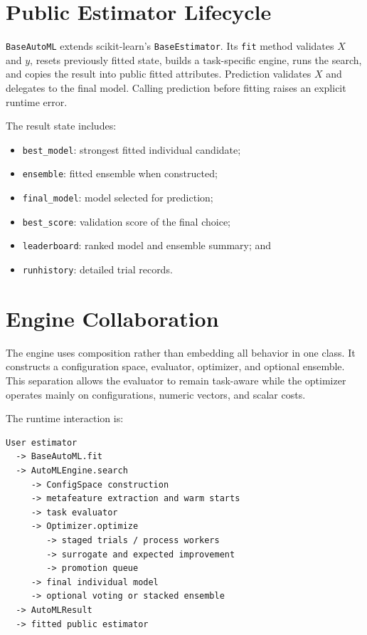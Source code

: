 \documentclass[12pt,a4paper,oneside]{report}
\begin{document}
\section{Public Estimator Lifecycle}

\texttt{BaseAutoML} extends scikit-learn's \texttt{BaseEstimator}. Its
\texttt{fit} method validates $X$ and $y$, resets previously fitted state,
builds a task-specific engine, runs the search, and copies the result into
public fitted attributes. Prediction validates $X$ and delegates to the final
model. Calling prediction before fitting raises an explicit runtime error.

\medskip

\noindent The result state includes:

\begin{itemize}[leftmargin=*]
  \item \texttt{best\_model}: strongest fitted individual candidate;
  \item \texttt{ensemble}: fitted ensemble when constructed;
  \item \texttt{final\_model}: model selected for prediction;
  \item \texttt{best\_score}: validation score of the final choice;
  \item \texttt{leaderboard}: ranked model and ensemble summary; and
  \item \texttt{runhistory}: detailed trial records.
\end{itemize}

\section{Engine Collaboration}

The engine uses composition rather than embedding all behavior in one class.
It constructs a configuration space, evaluator, optimizer, and optional
ensemble. This separation allows the evaluator to remain task-aware while the
optimizer operates mainly on configurations, numeric vectors, and scalar costs.

\medskip

\noindent The runtime interaction is:

\begin{verbatim}
User estimator
  -> BaseAutoML.fit
  -> AutoMLEngine.search
     -> ConfigSpace construction
     -> metafeature extraction and warm starts
     -> task evaluator
     -> Optimizer.optimize
        -> staged trials / process workers
        -> surrogate and expected improvement
        -> promotion queue
     -> final individual model
     -> optional voting or stacked ensemble
  -> AutoMLResult
  -> fitted public estimator
\end{verbatim}
\end{document}
